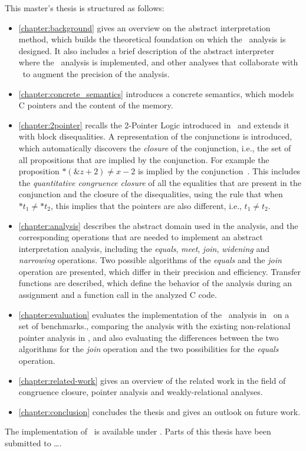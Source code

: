 This master's thesis is structured as follows:
\begin{itemize}
    \item \cref{chapter:background} gives an overview on the abstract interpretation method, which builds the theoretical foundation on which the \cpo\ analysis is designed.
    It also includes a brief description of the abstract interpreter \goblint\, where the \cpo\ analysis is implemented, and other analyses that collaborate with \cpo\ to augment the precision of the analysis.
    \item \cref{chapter:concrete_semantics} introduces a concrete semantics, which models C pointers and the content of the memory.
    \item \cref{chapter:2pointer} recalls the 2-Pointer Logic introduced in~\cite{2pointer} and extends it with block disequalities.
    A representation of the conjunctions is introduced, which automatically discovers the \emph{closure} of the conjunction,
    i.e., the set of all propositions that are implied by the conjunction.
    For example the proposition $*(\&z + 2) \neq x - 2$ is implied by the conjunction~.
    This includes the \emph{quantitative congruence closure} of all the equalities that are present in the conjunction and
    the closure of the disequalities, using the rule that when $*t_1 \neq *t_2$, this implies that the pointers are also different, i.e., $t_1 \neq t_2$.
    \item \cref{chapter:analysis} describes the abstract domain used in the analysis, and the corresponding operations that are needed to implement an abstract interpretation analysis, including the \emph{equals}, \emph{meet}, \emph{join}, \emph{widening} and \emph{narrowing} operations.
    Two possible algorithms of the \emph{equals} and the \emph{join} operation are presented, which differ in
    their precision and efficiency.
    Transfer functions are described, which define the behavior of the analysis during an assignment and a function call in the analyzed C code.
    \item \cref{chapter:evaluation} evaluates the implementation of the \cpo\ analysis in \goblint\ on a set of benchmarks.,
    comparing the analysis with the existing non-relational pointer analysis in \goblint, and also
    evaluating the differences between the two algorithms for the \emph{join} operation and the two possibilities for the \emph{equals} operation.
    \item \cref{chapter:related-work} gives an overview of the related work in the field of congruence closure, pointer analysis and weakly-relational analyses.
    \item \cref{chapter:conclusion} concludes the thesis and gives an outlook on future work.
\end{itemize}

The implementation of \cpo\ is available under . Parts of this thesis have been submitted to \dots.
